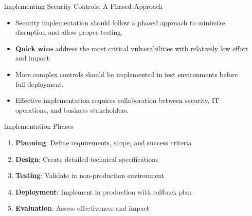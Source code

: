 \documentclass{beamer}
\begin{document}
                            \begin{frame}{Implementing Security Controls: A Phased Approach}
                            \begin{itemize}
                                \item Security implementation should follow a phased approach to minimize disruption and allow proper testing.
                                \item \textbf{Quick wins} address the most critical vulnerabilities with relatively low effort and impact.
                                \item More complex controls should be implemented in test environments before full deployment.
                                \item Effective implementation requires collaboration between security, IT operations, and business stakeholders.
                            \end{itemize}
                            
                            \begin{block}{Implementation Phases}
                            \begin{enumerate}
                                \item \textbf{Planning}: Define requirements, scope, and success criteria
                                \item \textbf{Design}: Create detailed technical specifications
                                \item \textbf{Testing}: Validate in non-production environment
                                \item \textbf{Deployment}: Implement in production with rollback plan
                                \item \textbf{Evaluation}: Assess effectiveness and impact
                            \end{enumerate}
                            \end{block}
                            \end{frame}
                            
\end{document}
